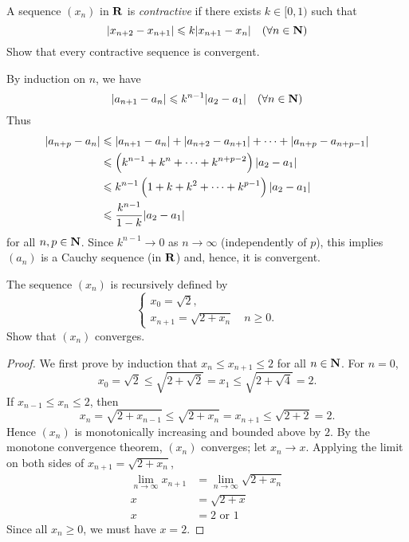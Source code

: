 \begin{prbm}
A sequence $(x_n)$ in $\mathbf R$ is \emph{contractive} if there exists $k\in[0,1)$ such that
\[|x_{n+2}-x_{n+1}|\leqslant k|x_{n+1}-x_n|\quad(\forall n\in\mathbf N)\]
Show that every contractive sequence is convergent.
\end{prbm}

\begin{solution}
By induction on $n$, we have
\[|a_{n+1}-a_n|\leqslant k^{n-1}|a_2-a_1|\quad(\forall n\in\mathbf N)\]
Thus
\begin{align*}
|a_{n+p}-a_{n}|&\leqslant|a_{n+1}-a_{n}|+|a_{n+2}-a_{n+1}|+\cdots+|a_{n+p}-a_{n+p-1}|\\ 
&\leqslant\left(k^{n-1}+k^{n}+\cdots+k^{n+p-2}\right)|a_{2}-a_{1}|\\ 
&\leqslant k^{n-1}\left(1+k+k^{2}+\cdots+k^{p-1}\right)|a_{2}-a_{1}|\\ 
&\leqslant\frac{k^{n-1}}{1-k}|a_{2}-a_{1}|
\end{align*}
for all $n,p\in\mathbf N$. Since $k^{n-1}\to0$ as $n\to\infty$ (independently of $p$), this implies $(a_n)$ is a Cauchy sequence (in $\mathbf R$) and, hence, it is convergent.
\end{solution}

\begin{prbm}
The sequence $(x_n)$ is recursively defined by
\[\begin{cases}
x_0=\sqrt{2},\\
x_{n+1}=\sqrt{2+x_n}\quad n\ge0.
\end{cases}\]
Show that $(x_n)$ converges.
\end{prbm}

\begin{proof}
We first prove by induction that $x_n\le x_{n+1}\le 2$ for all $n\in\mathbf N$. For $n=0$,
\[x_0=\sqrt{2}\le\sqrt{2+\sqrt{2}}=x_1\le\sqrt{2+\sqrt{4}}=2.\]
If $x_{n-1}\le x_n\le 2$, then
\[x_n=\sqrt{2+x_{n-1}}\le\sqrt{2+x_n}=x_{n+1}\le\sqrt{2+2}=2.\]
Hence $(x_n)$ is monotonically increasing and bounded above by $2$. By the monotone convergence theorem, $(x_n)$ converges; let $x_n\to x$. Applying the limit on both sides of $x_{n+1}=\sqrt{2+x_n}$,
\begin{align*}
\lim_{n\to\infty}x_{n+1}&=\lim_{n\to\infty}\sqrt{2+x_n}\\
x&=\sqrt{2+x}\\
x&=2\text{ or }1
\end{align*}
Since all $x_n\ge0$, we must have $x=2$.
\end{proof}